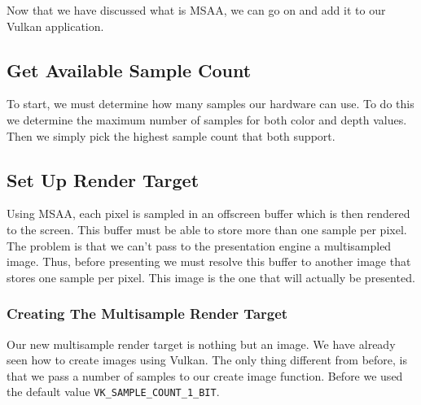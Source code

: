 Now that we have discussed what is MSAA, we can go on and add it to our
Vulkan application.

\subsection{Get Available Sample Count}

To start, we must determine how many samples our hardware can use.
To do this we determine the maximum number of samples for both color and
depth values.
Then we simply pick the highest sample count that both support.

\begin{minipage}{\linewidth}{\noindent}
    
\end{minipage}

\subsection{Set Up Render Target}

Using MSAA, each pixel is sampled in an offscreen buffer which is then
rendered to the screen.
This buffer must be able to store more than one sample per pixel.
The problem is that we can't pass to the presentation engine a multisampled image.
Thus, before presenting we must resolve this buffer to another image that
stores one sample per pixel.
This image is the one that will actually be presented.

\subsubsection{Creating The Multisample Render Target}

Our new multisample render target is nothing but an image.
We have already seen how to create images using Vulkan.
The only thing different from before, is that we pass
a number of samples to our create image function.
Before we used the default value \texttt{VK\_SAMPLE\_COUNT\_1\_BIT}.

\begin{minipage}{\linewidth}{\noindent}
    
\end{minipage}

